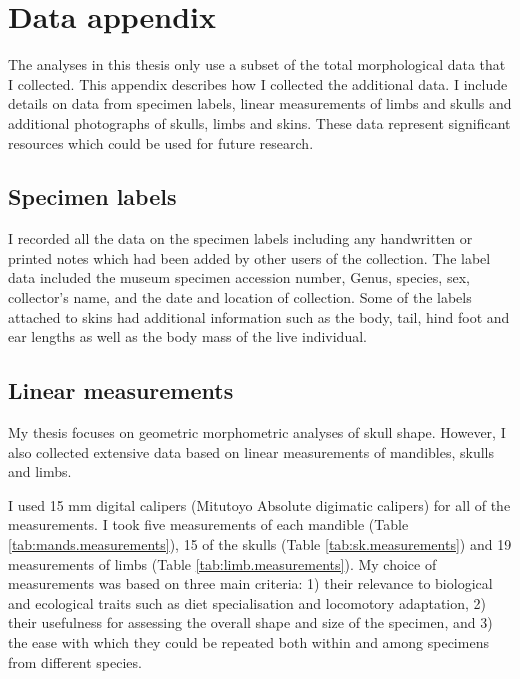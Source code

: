 

\chapter{Data appendix}
\label{appendix}

	The analyses in this thesis only use a subset of the total morphological data that I collected. This appendix describes how I collected the additional data. I include details on data from specimen labels, linear measurements of limbs and skulls and additional photographs of skulls, limbs and skins. These data represent significant resources which could be used for future research.

\section{Specimen labels}

	I recorded all the data on the specimen labels including any handwritten or printed notes which had been added by other users of the collection. The label data included the museum specimen accession number, Genus, species, sex, collector's name, and the date and location of collection. Some of the labels attached to skins had additional information such as the body, tail, hind foot and ear lengths as well as the body mass of the live individual. 
\section{Linear measurements}
\label{sect:measurements}

	My thesis focuses on geometric morphometric analyses of skull shape. However, I also collected extensive data based on linear measurements of mandibles, skulls and limbs. 
	
	I used 15 mm digital calipers (Mitutoyo Absolute digimatic calipers) for all of the measurements. I took five measurements of each mandible (Table \ref{tab:mands.measurements}), 15 of the skulls (Table \ref{tab:sk.measurements}) and 19 measurements of limbs (Table \ref{tab:limb.measurements}). My choice of  measurements was based on three main criteria: 1) their relevance to biological and ecological traits such as diet specialisation and locomotory adaptation, 2) their usefulness for assessing the overall shape and size of the specimen, and 3) the ease with which they could be repeated both within and among specimens from different species. 

